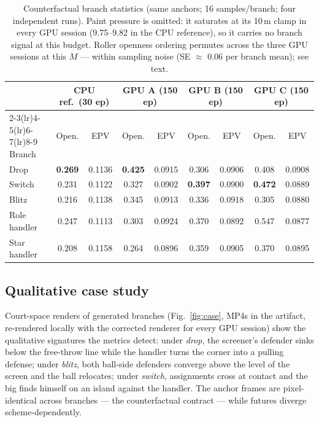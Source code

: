 \documentclass[11pt]{article}
\begin{document}
\begin{table}[t]
\centering
\caption{Counterfactual branch statistics (same anchors; 16 samples/branch;
four independent runs). Paint pressure is omitted: it saturates at its
10\,m clamp in every GPU session (9.75--9.82 in the CPU reference), so it
carries no branch signal at this budget. Roller openness ordering permutes
across the three GPU sessions at this $M$ --- within sampling noise
(SE $\approx$ 0.06 per branch mean); see text.}
\label{tab:cf}
\begin{tabular}{lcccccccc}
\toprule
 & \multicolumn{2}{c}{CPU ref.\ (30 ep)} & \multicolumn{2}{c}{GPU A (150 ep)} & \multicolumn{2}{c}{GPU B (150 ep)} & \multicolumn{2}{c}{GPU C (150 ep)} \\
\cmidrule(lr){2-3}\cmidrule(lr){4-5}\cmidrule(lr){6-7}\cmidrule(lr){8-9}
Branch & Open. & EPV & Open. & EPV & Open. & EPV & Open. & EPV \\
\midrule
Drop & \textbf{0.269} & 0.1136 & \textbf{0.425} & 0.0915 & 0.306 & 0.0906 & 0.408 & 0.0908 \\
Switch & 0.231 & 0.1122 & 0.327 & 0.0902 & \textbf{0.397} & 0.0900 & \textbf{0.472} & 0.0889 \\
Blitz & 0.216 & 0.1138 & 0.345 & 0.0913 & 0.336 & 0.0918 & 0.305 & 0.0880 \\
\midrule
Role handler & 0.247 & 0.1113 & 0.303 & 0.0924 & 0.370 & 0.0892 & 0.547 & 0.0877 \\
Star handler & 0.208 & 0.1158 & 0.264 & 0.0896 & 0.359 & 0.0905 & 0.370 & 0.0895 \\
\bottomrule
\end{tabular}
\end{table}

\subsection{Qualitative case study}
\label{sec:res-qual}

Court-space renders of generated branches (Fig.~\ref{fig:case}, MP4s in the
artifact, re-rendered locally with the corrected renderer for every GPU
session) show the qualitative
signatures the metrics detect: under \emph{drop}, the screener's defender
sinks below the free-throw line while the handler turns the corner into a
pulling defense; under \emph{blitz}, both ball-side defenders converge above
the level of the screen and the ball relocates; under \emph{switch},
assignments cross at contact and the big finds himself on an island against
the handler. The anchor frames are pixel-identical across branches --- the
counterfactual contract --- while futures diverge scheme-dependently.
\end{document}

